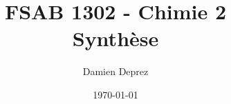 \documentclass[12pt,a4paper,twoside]{report}
\begin{document}
\makeatletter

\author{Damien Deprez}
\title{FSAB 1302 - Chimie 2\\Synthèse}
\date{\today}
\titre{\@title}{\@author}{\@date}{}{}

\tableofcontents
\end{document}
